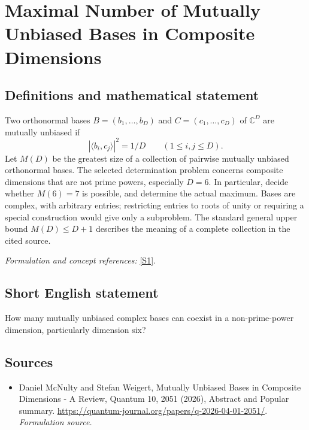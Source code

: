 \documentclass[11pt]{article}
\begin{document}
\section*{\texorpdfstring{Maximal Number of Mutually Unbiased Bases in Composite Dimensions}{Maximal Number of Mutually Unbiased Bases in Composite Dimensions}}\label{435}
\subsection{Definitions and mathematical statement}
Two orthonormal bases $B=(b_1,\ldots,b_D)$ and $C=(c_1,\ldots,c_D)$ of ${\mathbb{C}}^D$ are mutually unbiased if
\[
 |\langle b_i,c_j\rangle|^2=1/D\qquad(1\le i,j\le D).
\]
Let $M(D)$ be the greatest size of a collection of pairwise mutually unbiased orthonormal bases. The selected determination problem concerns composite dimensions that are not prime powers, especially $D=6$. In particular, decide whether $M(6)=7$ is possible, and determine the actual maximum. Bases are complex, with arbitrary entries; restricting entries to roots of unity or requiring a special construction would give only a subproblem. The standard general upper bound $M(D)\le D+1$ describes the meaning of a complete collection in the cited source.
\par\smallskip\textit{Formulation and concept references:} \href{https://quantum-journal.org/papers/q-2026-04-01-2051/}{[S1]}.

\subsection{Short English statement}
How many mutually unbiased complex bases can coexist in a non-prime-power dimension, particularly dimension six?
\subsection{Sources}
\begin{itemize}
\item[S1]Daniel McNulty and Stefan Weigert, Mutually Unbiased Bases in Composite Dimensions - A Review, Quantum 10, 2051 (2026), Abstract and Popular summary.
\url{https://quantum-journal.org/papers/q-2026-04-01-2051/}.
\textit{Formulation source.}
\end{itemize}
\end{document}
